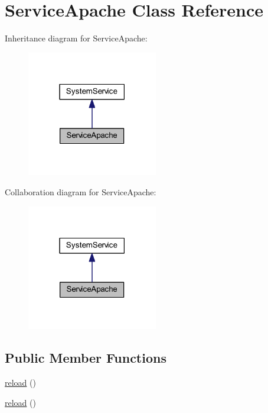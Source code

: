 \hypertarget{class_service_apache}{}\section{Service\+Apache Class Reference}
\label{class_service_apache}


Inheritance diagram for Service\+Apache\+:
\nopagebreak
\begin{figure}[H]
\begin{center}
\leavevmode
\includegraphics[width=162pt]{class_service_apache__inherit__graph}
\end{center}
\end{figure}


Collaboration diagram for Service\+Apache\+:
\nopagebreak
\begin{figure}[H]
\begin{center}
\leavevmode
\includegraphics[width=162pt]{class_service_apache__coll__graph}
\end{center}
\end{figure}
\subsection*{Public Member Functions}
\begin{DoxyCompactItemize}
\item 
\hyperlink{class_service_apache_a7b2a44f6ec87a111c1bc3cc911cd15f5}{reload} ()
\item 
\hyperlink{class_service_apache_a7b2a44f6ec87a111c1bc3cc911cd15f5}{reload} ()
\end{DoxyCompactItemize}
